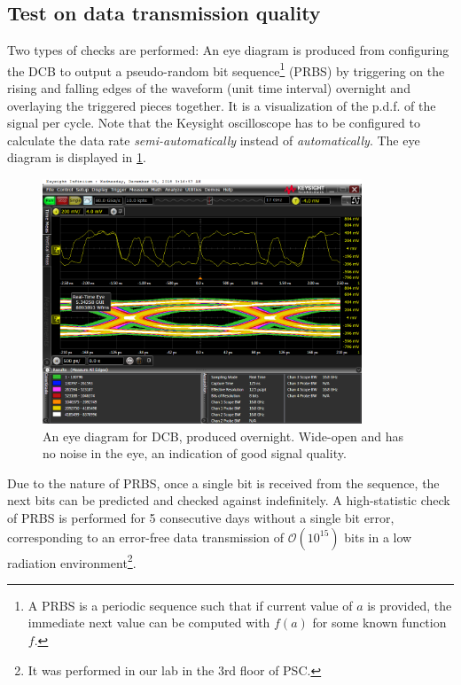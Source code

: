 \subsection{Test on data transmission quality}
\label{dcb-test-data}

Two types of checks are performed:
An eye diagram is produced from configuring the DCB to output a pseudo-random
bit sequence\footnote{
    A PRBS is a periodic sequence such that if current value of $a$ is provided,
    the immediate next value can be computed with $f(a)$ for some known function
    $f$.
} (PRBS) by triggering on the rising and falling edges
of the waveform (unit time interval) overnight and overlaying the triggered
pieces together.
It is a visualization of the p.d.f. of the signal per cycle.
Note that the Keysight oscilloscope has to be configured to calculate the
data rate \emph{semi-automatically} instead of \emph{automatically}.
The eye diagram is displayed in \cref{fig:dcb-eye}.

\begin{figure}[!htb]
    \centering
    \includegraphics[width=0.85\textwidth]{./figs-ut-upgrade/dcb/dcb_eye_diagram.png}
    \caption{
        An eye diagram for DCB, produced overnight.
        Wide-open and has no noise in the eye, an indication of good signal
        quality.
    }
    \label{fig:dcb-eye}
\end{figure}

Due to the nature of PRBS, once a single bit is received from the sequence,
the next bits can be predicted and checked against indefinitely.
A high-statistic check of PRBS is performed for 5 consecutive days without
a single bit error, corresponding to an error-free data transmission of
$\mathcal{O}(10^{15})$ bits in a low radiation environment\footnote{
    It was performed in our lab in the 3rd floor of PSC.
}.


